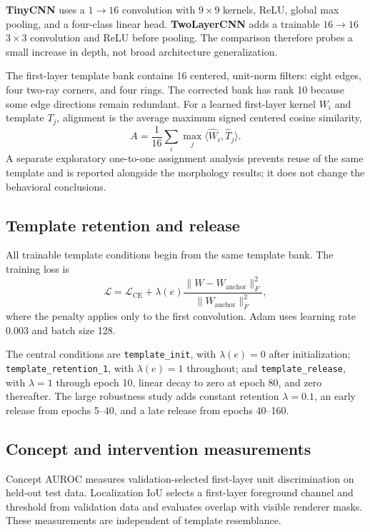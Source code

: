 \documentclass[10pt]{article}
\begin{document}
\textbf{TinyCNN} uses a $1\to16$ convolution with $9\times9$ kernels, ReLU, global max pooling, and a four-class linear head. \textbf{TwoLayerCNN} adds a trainable $16\to16$ $3\times3$ convolution and ReLU before pooling. The comparison therefore probes a small increase in depth, not broad architecture generalization.

The first-layer template bank contains 16 centered, unit-norm filters: eight edges, four two-ray corners, and four rings. The corrected bank has rank 10 because some edge directions remain redundant. For a learned first-layer kernel $W_i$ and template $T_j$, alignment is the average maximum signed centered cosine similarity,
\[
A=\frac{1}{16}\sum_i\max_j\langle \widehat W_i,\widehat T_j\rangle.
\]
A separate exploratory one-to-one assignment analysis prevents reuse of the same template and is reported alongside the morphology results; it does not change the behavioral conclusions.

\subsection{Template retention and release}\label{sec:retention}

All trainable template conditions begin from the same template bank. The training loss is
\[
\mathcal L=\mathcal L_{\mathrm{CE}}+
\lambda(e)\frac{\lVert W-W_{\mathrm{anchor}}\rVert_F^2}
{\lVert W_{\mathrm{anchor}}\rVert_F^2},
\]
where the penalty applies only to the first convolution. Adam uses learning rate 0.003 and batch size 128.

The central conditions are \texttt{template\_init}, with $\lambda(e)=0$ after initialization; \texttt{template\_retention\_1}, with $\lambda(e)=1$ throughout; and \texttt{template\_release}, with $\lambda=1$ through epoch 10, linear decay to zero at epoch 80, and zero thereafter. The large robustness study adds constant retention $\lambda=0.1$, an early release from epochs 5--40, and a late release from epochs 40--160.

\subsection{Concept and intervention measurements}\label{sec:measurements}

Concept AUROC measures validation-selected first-layer unit discrimination on held-out test data. Localization IoU selects a first-layer foreground channel and threshold from validation data and evaluates overlap with visible renderer masks. These measurements are independent of template resemblance.
\end{document}
